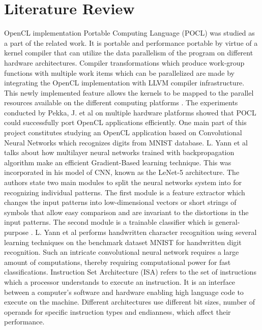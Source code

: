 \chapter{Literature Review}
\label{ch3_lit_review}
OpenCL implementation Portable Computing Language (POCL) was studied as a part of the related work. It is portable and performance portable by virtue of a kernel compiler that can utilize the data parallelism of the program on different hardware architectures. Compiler transformations which produce work-group functions with multiple work items which can be parallelized are made by integrating the OpenCL implementation with LLVM compiler infrastructure. This newly implemented feature allows the kernels to be mapped to the parallel resources available on the different computing platforms
\cite{pocl}. The experiments conducted by Pekka, J. et al on multiple hardware platforms showed that POCL could successfully port OpenCL applications efficiently.\newline\newline
One main part of this project constitutes studying an OpenCL application based on Convolutional Neural Networks which recognizes digits from MNIST database. L. Yann et al talks about how multilayer neural networks trained with backpropagation algorithm make an efficient Gradient-Based learning technique. This was incorporated in his model of CNN, known as the LeNet-5 architecture. The authors state two main modules to split the neural networks system into for recognizing individual patterns. The first module is a feature extractor which changes the input patterns into low-dimensional vectors or short strings of symbols that allow easy comparison and are invariant to the distortions in the input patterns. The second module is a trainable classifier which is general-purpose 
\cite{cnn_yann1998}. L. Yann et al performs handwritten character recognition using several learning techniques on the benchmark dataset MNIST for handwritten digit recognition. Such an intricate convolutional neural network requires a large amount of computations, thereby requiring computational power for fast classifications.  \newline\newline
Instruction Set Architecture (ISA) refers to the set of instructions which a processor understands to execute an instruction. It is an interface between a computer’s software and hardware enabling high language code to execute on the machine. Different architectures use different bit sizes, number of operands for specific instruction types and endianness, which affect their performance.\newline\newline
